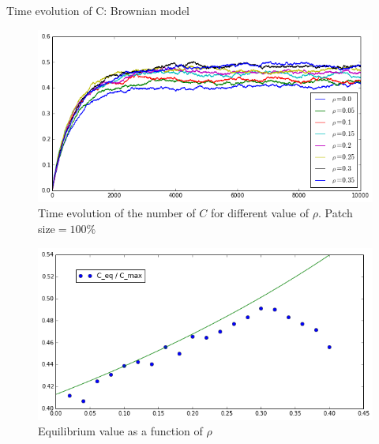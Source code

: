 \documentclass{beamer}
\begin{document}
\begin{frame}
{Time evolution of C: Brownian model}
\begin{figure}
\includegraphics[width=\textwidth]{C_rhovar}
\caption{Time evolution of the number of $C$ for different value of $\rho$. Patch size$=100\%$}
\end{figure}
\end{frame}


\begin{frame}
\begin{figure}
\includegraphics[width=\textwidth]{Ceq_rhovar}
\caption{Equilibrium value as a function of $\rho$}
\end{figure}
\end{frame}
\end{document}
